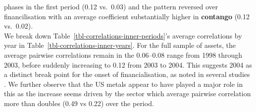 \documentclass[
  authoryear,
  preprint,
  3p]{elsarticle}
\begin{document}
phases in the first period (0.12 vs.~0.03) and the pattern reversed over
financilisation with an average coefficient substantially higher in
\textbf{contango} (0.12 vs.~0.02).\\
We break down Table~\ref{tbl-correlations-inner-periods}'s average
correlations by year in Table~\ref{tbl-correlations-inner-years}. For
the full sample of assets, the average pairwise correlations remain in
the 0.06--0.08 range from 1998 through 2003, before suddenly increasing
to 0.12 from 2003 to 2004. This suggests 2004 as a distinct break point
for the onset of financialisation, as noted in several studies
\citep{baker_financialization_2021, tang_index_2012}. We further observe
that the US metals appear to have played a major role in this as the
increase seems driven by the sector which average pairwise correlation
more than doubles (0.49 vs 0.22) over the period.

\medskip
\end{document}
